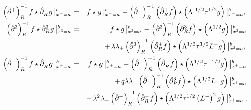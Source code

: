\documentclass[a4paper,11pt,oneside]{article}
\begin{document}
\begin{eqnarray}
\left( \hat{\partial}^{+}\right) _{R}^{-1}f\star \hat{\partial}%
_{R}^{+}g\left| _{x^{-}=a}^{b}\right. &=&f\star g\left|
_{x^{-}=a}^{b}\right. -\left( \hat{\partial}^{+}\right) _{R}^{-1}\left( \hat{%
\partial}_{R}^{+}f\right) \star \left( \Lambda ^{\ 1/2}\tau ^{1/2}g\right)
\left| _{x^{-}=a}^{b},\right. \\
\left( \hat{\partial}^{3}\right) _{R}^{-1}f\star \hat{\partial}%
_{R}^{3}g\left| _{x^{3}=a}^{b}\right. &=&f\star g\left|
_{x^{3}=a}^{b}\right. -\left( \hat{\partial}^{3}\right) _{R}^{-1}\left( \hat{%
\partial}_{R}^{3}f\right) \star \left( \Lambda ^{1/2}g\right) \left|
_{x^{3}=a}^{b}\right.  \nonumber \\
&&+\,\lambda \lambda _{+}\left( \hat{\partial}^{3}\right) _{R}^{-1}\left( 
\hat{\partial}_{R}^{+}f\right) \star \left( \Lambda ^{1/2}\tau
^{1/2}L^{-}g\right) \left| _{x^{3}=a}^{b},\right.  \nonumber \\
\left( \hat{\partial}^{-}\right) _{R}^{-1}f\star \hat{\partial}%
_{R}^{-}g\left| _{x^{+}=a}^{b}\right. &=&f\star g\left|
_{x^{+}=a}^{b}\right. -\left( \hat{\partial}^{-}\right) _{R}^{-1}\left( \hat{%
\partial}_{R}^{-}f\right) \star \left( \Lambda ^{1/2}\tau ^{-1/2}g\right)
\left| _{x^{+}=a}^{b}\right.  \nonumber \\
&&+\,q\lambda \lambda _{+}\left( \hat{\partial}^{-}\right) _{R}^{-1}\left( 
\hat{\partial}_{R}^{3}f\right) \star \left( \Lambda ^{1/2}L^{-}g\right)
\left| _{x^{+}=a}^{b}\right.  \nonumber \\
&&-\,\lambda ^{2}\lambda _{+}\left( \hat{\partial}^{-}\right)
_{R}^{-1}\left( \hat{\partial}_{R}^{+}f\right) \star \left( \Lambda
^{1/2}\tau ^{1/2}\left( L^{-}\right) ^{2}g\right) \left|
_{x^{+}=a}^{b}\right. .  \nonumber
\end{eqnarray}
\end{document}
